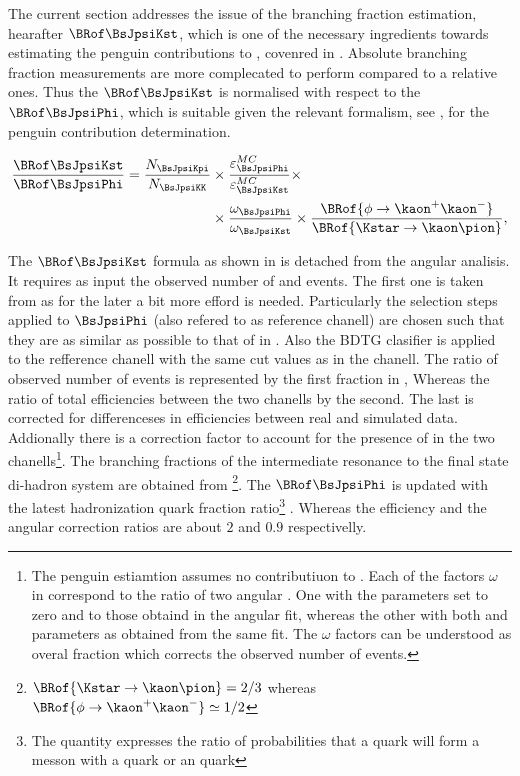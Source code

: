 
The current section addresses the issue of the \BsJpsiKst branching fraction estimation, hearafter $\BRof\BsJpsiKst$,
which is one of the necessary ingredients towards estimating the penguin contributions to \phis, covenred in .
Absolute branching fraction measurements are more complecated to perform compared to a relative ones. Thus the $\BRof\BsJpsiKst$
is normalised with respect to the $\BRof\BsJpsiPhi$, which is suitable given the relevant formalism, see ,
for the penguin contribution determination.

\begin{align}
\frac{\BRof\BsJpsiKst}{\BRof\BsJpsiPhi} = \frac{N_{\BsJpsiKpi}}{N_{\BsJpsiKK}} &\times \frac{\varepsilon_{\BsJpsiPhi}^{MC}}{\varepsilon_{\BsJpsiKst}^{MC}} \times \nonumber \\
                                                                          &\times \frac{\omega_{\BsJpsiPhi}}{\omega_{\BsJpsiKst}} \times \frac{\BRof{\phi\to\kaon^+\kaon^-}}{\BRof{\Kstar\to\kaon\pion}},
\label{norm_jpsiPhi}
\end{align}

\noindent The $\BRof\BsJpsiKst$ formula as shown in  is detached from the angular analisis. It requires as input the observed number
of \BsJpsiKst and \BsJpsiPhi events. The first one is taken from  as for the later a bit more efford is needed.
Particularly the selection steps applied to $\BsJpsiPhi$ (also refered to as reference chanell) are chosen such that they are as
similar as possible to that of \BsJpsiKst in . Also the BDTG clasifier is applied to the refference chanell
with the same cut values as in the \BsJpsiKst chanell. The ratio of observed number of events is represented by the first fraction in ,
Whereas the ratio of total efficiencies between the two chanells by the second. The last is corrected for differenceses in efficiencies between real and
simulated data. Addionally there is a correction factor to account for the presence of \swave in the two
chanells\footnote{The penguin estiamtion assumes no \swave contributiuon to \BsJpsiKst. Each of the factors $\omega$ in  correspond
to the ratio of two angular \pdfs. One with the \swave parameters set to zero and \pwave to those obtaind in the angular fit,  whereas the other
with both \pwave and \swave parameters as obtained from the same fit. The $\omega$ factors can be understood as overal \swave fraction which
corrects the observed number of events.
}. The branching fractions of the intermediate resonance to the final state di-hadron system are obtained from \cite{PDG}
\footnote{ $\BRof{\Kstar\to\kaon\pion} = 2/3$ whereas $\BRof{\phi\to\kaon^+\kaon^-}\simeq 1/2$}.
The $\BRof\BsJpsiPhi$ \cite{SheldonKK} is updated with the latest hadronization \bquark quark fraction
ratio\footnote{The quantity \fdfs expresses the ratio of probabilities that a \bquark quark will form a messon with a \dquark quark or an \squark quark}
\cite{LHCb-CONF-2013-011}. Whereas the efficiency and the angular correction ratios are about $2$ and $0.9$ respectivelly.


